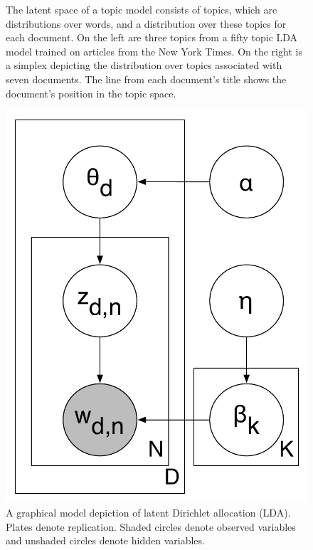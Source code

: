 \begin{figure}[t]
{  \label{fig:nyttopics:doc}
}
\caption{The latent space of a topic model consists of topics,
  which are distributions over words, and a distribution over these
  topics for each document.  On the left are three topics from a
  fifty topic LDA model trained on articles from the New York
  Times.  On the right is a simplex depicting the distribution
  over topics associated with seven documents.  The line from each
  document's title shows the document's position in the topic
  space.}
\label{fig:nyttopics:big}
\end{figure}

\begin{figure}[t]
\centering
\includegraphics[width=0.7\linewidth]{figures/lda}
\caption{A graphical model depiction of latent Dirichlet allocation
  (LDA).  Plates denote replication.  Shaded circles denote observed
  variables and unshaded circles denote hidden variables.}
\label{fig:lda}
\end{figure}


